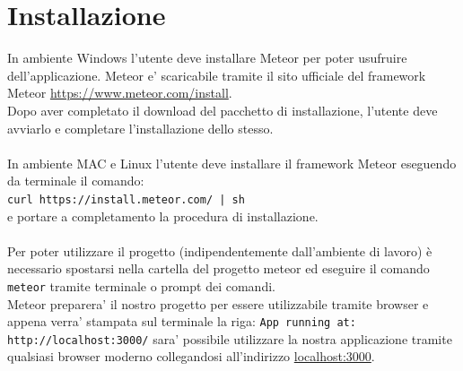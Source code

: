 \documentclass[a4paper,11pt]{article}
\newcommand{\code}[1]{\texttt{#1}}
\begin{document}
\section{Installazione}
In ambiente Windows l'utente deve installare Meteor per poter usufruire dell'applicazione.
Meteor e' scaricabile tramite il sito ufficiale del framework Meteor \url{https://www.meteor.com/install}.\\
Dopo aver completato il download del pacchetto di installazione, l'utente deve avviarlo e completare l'installazione dello stesso. \\ \\In ambiente MAC e Linux l'utente deve installare il framework Meteor eseguendo da terminale il comando: \\ \code{curl https://install.meteor.com/ | sh}\\
e portare a completamento la procedura di installazione.\\ \\Per poter utilizzare il progetto (indipendentemente dall'ambiente di lavoro) è necessario spostarsi nella
cartella del progetto meteor ed eseguire il comando \code{meteor} tramite terminale o prompt dei comandi.\\
Meteor preparera' il nostro progetto per essere utilizzabile tramite browser e appena verra' stampata sul terminale la riga: \code{App running at: http://localhost:3000/}
sara' possibile utilizzare la nostra applicazione tramite qualsiasi browser moderno collegandosi all'indirizzo \url{localhost:3000}.
	\newpage
\end{document}
